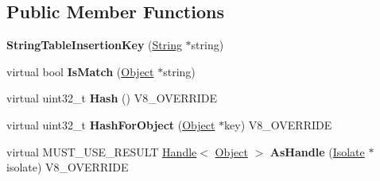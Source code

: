 \subsection*{Public Member Functions}
\begin{DoxyCompactItemize}
\item 
\hypertarget{classv8_1_1internal_1_1_string_table_insertion_key_abaea315ebc0408ec7e2c136502688c14}{}{\bfseries String\+Table\+Insertion\+Key} (\hyperlink{classv8_1_1internal_1_1_string}{String} $\ast$string)\label{classv8_1_1internal_1_1_string_table_insertion_key_abaea315ebc0408ec7e2c136502688c14}

\item 
\hypertarget{classv8_1_1internal_1_1_string_table_insertion_key_a92e8d6ccb700b01cfca3c3dbaef45af4}{}virtual bool {\bfseries Is\+Match} (\hyperlink{classv8_1_1internal_1_1_object}{Object} $\ast$string)\label{classv8_1_1internal_1_1_string_table_insertion_key_a92e8d6ccb700b01cfca3c3dbaef45af4}

\item 
\hypertarget{classv8_1_1internal_1_1_string_table_insertion_key_a26d3246211aeb1bbb7356c4fa3b0c44c}{}virtual uint32\+\_\+t {\bfseries Hash} () V8\+\_\+\+O\+V\+E\+R\+R\+I\+D\+E\label{classv8_1_1internal_1_1_string_table_insertion_key_a26d3246211aeb1bbb7356c4fa3b0c44c}

\item 
\hypertarget{classv8_1_1internal_1_1_string_table_insertion_key_a87798bb4d845ce8b5f5f7fb7cdd25c86}{}virtual uint32\+\_\+t {\bfseries Hash\+For\+Object} (\hyperlink{classv8_1_1internal_1_1_object}{Object} $\ast$key) V8\+\_\+\+O\+V\+E\+R\+R\+I\+D\+E\label{classv8_1_1internal_1_1_string_table_insertion_key_a87798bb4d845ce8b5f5f7fb7cdd25c86}

\item 
\hypertarget{classv8_1_1internal_1_1_string_table_insertion_key_a549ef5e0ec79bc00ca336dc00b3715a1}{}virtual M\+U\+S\+T\+\_\+\+U\+S\+E\+\_\+\+R\+E\+S\+U\+L\+T \hyperlink{classv8_1_1internal_1_1_handle}{Handle}$<$ \hyperlink{classv8_1_1internal_1_1_object}{Object} $>$ {\bfseries As\+Handle} (\hyperlink{classv8_1_1internal_1_1_isolate}{Isolate} $\ast$isolate) V8\+\_\+\+O\+V\+E\+R\+R\+I\+D\+E\label{classv8_1_1internal_1_1_string_table_insertion_key_a549ef5e0ec79bc00ca336dc00b3715a1}

\end{DoxyCompactItemize}
